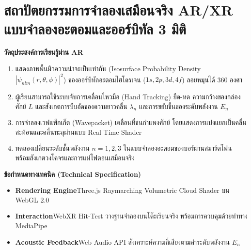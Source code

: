 \section{สถาปัตยกรรมการจำลองเสมือนจริง AR/XR แบบจำลองอะตอมและออร์บิทัล 3 มิติ}

\begin{arbox}
\textbf{วัตถุประสงค์การเรียนรู้ผ่าน AR}
\begin{enumerate}
    \item แสดงภาพพื้นผิวความน่าจะเป็นเท่ากัน (Isosurface Probability Density $|\psi_{nlm}(r,\theta,\phi)|^2$) ของออร์บิทัลอะตอมไฮโดรเจน ($1s, 2p, 3d, 4f$) ลอยหมุนได้ 360 องศา
    \item ผู้เรียนสามารถใช้ระบบจับการเคลื่อนไหวมือ (Hand Tracking) ยืด-หด ความกว้างของกล่องศักย์ $L$ และสังเกตการบีบอัดของความยาวคลื่น $\lambda_n$ และการขยับขึ้นของระดับพลังงาน $E_n$
    \item การจำลองเวฟแพ็กเก็ต (Wavepacket) เคลื่อนที่ชนกำแพงศักย์ โดยแสดงการแบ่งแยกเป็นคลื่นสะท้อนและคลื่นทะลุผ่านแบบ Real-Time Shader
    \item ทดลองเปลี่ยนระดับชั้นพลังงาน $n=1, 2, 3$ ในแบบจำลองอะตอมของบอร์ผ่านสมาร์ตโฟน พร้อมสังเกตวงโคจรและการแผ่โฟตอนเสมือนจริง
\end{enumerate}

\textbf{ข้อกำหนดทางเทคนิค (Technical Specification)}
\begin{itemize}
    \item \textbf{Rendering Engine}\quad Three.js Raymarching Volumetric Cloud Shader บน WebGL 2.0
    \item \textbf{Interaction}\quad WebXR Hit-Test วางฐานจำลองบนโต๊ะเรียนจริง พร้อมการควบคุมด้วยท่าทาง MediaPipe
    \item \textbf{Acoustic Feedback}\quad Web Audio API สังเคราะห์ความถี่เสียงตามค่าระดับพลังงาน $E_n$
\end{itemize}
\end{arbox}

